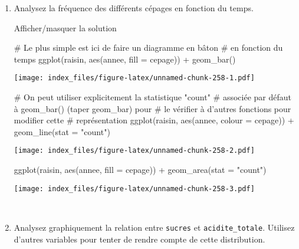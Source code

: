 \documentclass[12pt,]{article}
\newenvironment{Shaded}{}{}
\newcommand{\KeywordTok}[1]{\textcolor[rgb]{0.00,0.00,1.00}{{#1}}}
\newcommand{\DataTypeTok}[1]{{#1}}
\newcommand{\StringTok}[1]{\textcolor[rgb]{0.00,0.50,0.50}{{#1}}}
\newcommand{\CommentTok}[1]{\textcolor[rgb]{0.00,0.50,0.00}{{#1}}}
\newcommand{\NormalTok}[1]{{#1}}
\begin{document}
\begin{enumerate}
  ~
\item
  Analysez la fréquence des différents cépages en fonction du temps.

  Afficher/masquer la solution

  \hypertarget{sol71}{}
\begin{Shaded}
\begin{Highlighting}[]
\CommentTok{# Le plus simple est ici de faire un diagramme en bâton}
\CommentTok{# en fonction du temps}
\KeywordTok{ggplot}\NormalTok{(raisin, }\KeywordTok{aes}\NormalTok{(annee, }\DataTypeTok{fill =} \NormalTok{cepage)) +}\StringTok{ }\KeywordTok{geom_bar}\NormalTok{()}
\end{Highlighting}
\end{Shaded}

  \texttt{[image: index\_files/figure-latex/unnamed-chunk-258-1.pdf]}

\begin{Shaded}
\begin{Highlighting}[]

\CommentTok{# On peut utiliser explicitement la statistique "count"}
\CommentTok{# associée par défaut à geom_bar() (taper geom_bar) pour}
\CommentTok{# le vérifier à d'autres fonctions pour modifier cette}
\CommentTok{# représentation}
\KeywordTok{ggplot}\NormalTok{(raisin, }\KeywordTok{aes}\NormalTok{(annee, }\DataTypeTok{colour =} \NormalTok{cepage)) +}\StringTok{ }\KeywordTok{geom_line}\NormalTok{(}\DataTypeTok{stat =} \StringTok{"count"}\NormalTok{)}
\end{Highlighting}
\end{Shaded}

  \texttt{[image: index\_files/figure-latex/unnamed-chunk-258-2.pdf]}

\begin{Shaded}
\begin{Highlighting}[]
\KeywordTok{ggplot}\NormalTok{(raisin, }\KeywordTok{aes}\NormalTok{(annee, }\DataTypeTok{fill =} \NormalTok{cepage)) +}\StringTok{ }\KeywordTok{geom_area}\NormalTok{(}\DataTypeTok{stat =} \StringTok{"count"}\NormalTok{)}
\end{Highlighting}
\end{Shaded}

  \texttt{[image: index\_files/figure-latex/unnamed-chunk-258-3.pdf]}

  ~
\item
  Analysez graphiquement la relation entre \texttt{sucres} et
  \texttt{acidite\_totale}. Utilisez d'autres variables pour tenter de
  rendre compte de cette distribution.


\end{enumerate}
\end{document}
